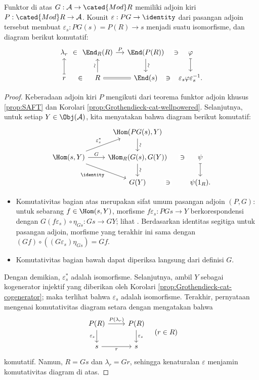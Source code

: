 \begin{lemma}\label{prop:GP-prep}
	Funktor di atas $G: \mathcal{A} \to \cated{Mod}R$ memiliki adjoin kiri $P: \cated{Mod}R \to \mathcal{A}$. Kounit $\varepsilon: PG \to \identity$ dari pasangan adjoin tersebut membuat $\varepsilon_s: PG(s) = P(R) \to s$ menjadi suatu isomorfisme, dan diagram berikut komutatif:
	\[\begin{tikzcd}[column sep=small]
		\lambda_r \arrow[phantom, r, "\in" description] & \End_R(R) \arrow[r, "P"] & \End(P(R)) \arrow[d, "\sim" sloped] & \varphi \arrow[phantom, l, "\ni" description] \arrow[mapsto, d] \\
		r \arrow[phantom, r, "\in" description] \arrow[mapsto, u] & R \arrow[u, "\sim" sloped] \arrow[equal, r] & \End(s) & \varepsilon_s \varphi \varepsilon_s^{-1} \arrow[phantom, l, "\ni" description] .
	\end{tikzcd}\]
\end{lemma}
\begin{proof}
	Keberadaan adjoin kiri $P$ mengikuti dari teorema funktor adjoin khusus \ref{prop:SAFT} dan Korolari \ref{prop:Grothendieck-cat-wellpowered}. Selanjutnya, untuk setiap $Y \in \Obj(\mathcal{A})$, kita menyatakan bahwa diagram berikut komutatif:
	\[\begin{tikzcd}
		& \Hom(PG(s), Y) \arrow[d, "\sim" sloped] & \\
		\Hom(s, Y) \arrow[ru, "{\varepsilon_s^*}"] \arrow[r, "G"] \arrow[rd, "\identity"'] & \Hom_R(G(s), G(Y)) \arrow[d, "\sim" sloped] & \psi \arrow[phantom, l, "\ni" description, sloped] \arrow[mapsto, d] \\
		& G(Y) & \psi(1_R). \arrow[phantom, l, "\ni" description, sloped]
	\end{tikzcd}\]
	\begin{itemize}
		\item Komutativitas bagian atas merupakan sifat umum pasangan adjoin $(P, G)$: untuk sebarang $f \in \Hom(s, Y)$, morfisme $f\varepsilon_s: PGs \to Y$ berkorespondensi dengan $G(f\varepsilon_s) \circ \eta_{Gs}: Gs \to GY$; lihat \cite[(2.5)]{Li1}. Berdasarkan identitas segitiga untuk pasangan adjoin, morfisme yang terakhir ini sama dengan $(Gf) \circ \left((G\varepsilon_s) \eta_{Gs}\right) = Gf$.
		\item Komutativitas bagian bawah dapat diperiksa langsung dari definisi $G$.
	\end{itemize}
	
	Dengan demikian, $\varepsilon_s^*$ adalah isomorfisme. Selanjutnya, ambil $Y$ sebagai kogenerator injektif yang diberikan oleh Korolari \ref{prop:Grothendieck-cat-cogenerator}; maka terlihat bahwa $\varepsilon_s$ adalah isomorfisme. Terakhir, pernyataan mengenai komutativitas diagram setara dengan mengatakan bahwa
	\[\begin{tikzcd}
		P(R) \arrow[r, "{P(\lambda_r)}"] \arrow[d, "{\varepsilon_s}"'] & P(R) \arrow[d, "{\varepsilon_s}"] \\
		s \arrow[r, "r"'] & s
	\end{tikzcd} \quad (r \in R) \]
	komutatif. Namun, $R = Gs$ dan $\lambda_r = Gr$, sehingga kenaturalan $\varepsilon$ menjamin komutativitas diagram di atas.
\end{proof}

